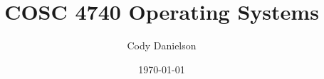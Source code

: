 \title{COSC 4740 Operating Systems} %
\def\homework{Written Q7}
\author{Cody Danielson}
\date{\today}